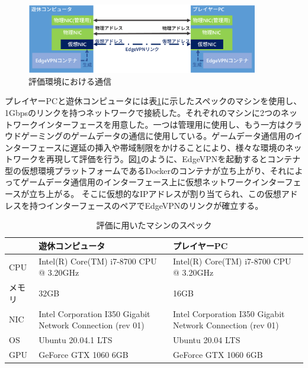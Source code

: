 \begin{figure}[t]
    \centering
    \includegraphics[width=0.9\textwidth,keepaspectratio,clip]{img/nic.eps}
    \caption{評価環境における通信}
    \label{fig:nic}
\end{figure}

プレイヤーPCと遊休コンピュータには表\ref{tab:spec}に示したスペックのマシンを使用し、1Gbpsのリンクを持つネットワークで接続した。それぞれのマシンに2つのネットワークインターフェースを用意した。一つは管理用に使用し、もう一方はクラウドゲーミングのゲームデータの通信に使用している。ゲームデータ通信用のインターフェースに遅延の挿入や帯域制限をかけることにより、様々な環境のネットワークを再現して評価を行う。図\ref{fig:nic}のように、EdgeVPNを起動するとコンテナ型の仮想環境プラットフォームであるDockerのコンテナが立ち上がり、それによってゲームデータ通信用のインターフェース上に仮想ネットワークインターフェースが立ち上がる。
そこに仮想的なIPアドレスが割り当てられ、この仮想アドレスを持つインターフェースのペアでEdgeVPNのリンクが確立する。

\begin{table}[t]
    \caption{評価に用いたマシンのスペック}
    \begin{tabularx}{\textwidth}{|l|X|X|}
        \hline
        & 遊休コンピュータ                                                   & プレイヤーPC                                                    \\ \hline
        CPU & Intel(R) Core(TM) i7-8700 CPU @ 3.20GHz                    & Intel(R) Core(TM) i7-8700 CPU @ 3.20GHz                    \\ \hline
        メモリ & 32GB                                                       & 16GB                                                       \\ \hline
        NIC & Intel Corporation I350 Gigabit Network Connection (rev 01) & Intel Corporation I350 Gigabit Network Connection (rev 01) \\ \hline
        OS  & Ubuntu 20.04.1 LTS                                         & Ubuntu 20.04 LTS                                           \\ \hline
        GPU & GeForce GTX 1060 6GB                                       & GeForce GTX 1060 6GB                                       \\ \hline
    \end{tabularx}
    \label{tab:spec}
\end{table}

